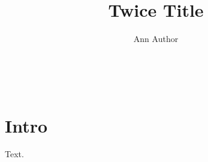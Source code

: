 \documentclass{article}
\title{Twice Title}\author{Ann Author}
\begin{document}
\begin{center}\@title\ \@title\end{center}
\begin{center}\@title\@title\end{center}
\maketitle
\section{Intro}
Text.
\end{document}
